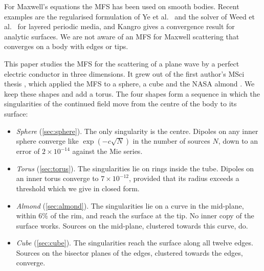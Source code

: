 For Maxwell's equations the MFS has been used on smooth bodies. Recent examples are the regularised formulation of Ye et al.\ \cite{ye2023} and the solver of Weed et al.\ \cite{weed2026} for layered periodic media, and Kangro \cite{kangro2012} gives a convergence result for analytic surfaces. We are not aware of an MFS for Maxwell scattering that converges on a body with edges or tips.

This paper studies the MFS for the scattering of a plane wave by a perfect electric conductor in three dimensions. It grew out of the first author's MSci thesis \cite{thesis2025}, which applied the MFS to a sphere, a cube and the NASA almond \cite{woo1993}. We keep these shapes and add a torus. The four shapes form a sequence in which the singularities of the continued field move from the centre of the body to its surface:
\begin{itemize}
  \item \emph{Sphere} (\autoref{sec:sphere}). The only singularity is the centre. Dipoles on any inner sphere converge like $\exp(-c\sqrt{N})$ in the number of sources $N$, down to an error of $2\times10^{-14}$ against the Mie series.
  \item \emph{Torus} (\autoref{sec:torus}). The singularities lie on rings inside the tube. Dipoles on an inner torus converge to $7\times 10^{-12}$, provided that its radius exceeds a threshold which we give in closed form.
  \item \emph{Almond} (\autoref{sec:almond}). The singularities lie on a curve in the mid-plane, within 6\% of the rim, and reach the surface at the tip. No inner copy of the surface works. Sources on the mid-plane, clustered towards this curve, do.
  \item \emph{Cube} (\autoref{sec:cube}). The singularities reach the surface along all twelve edges. Sources on the bisector planes of the edges, clustered towards the edges, converge.
\end{itemize}

